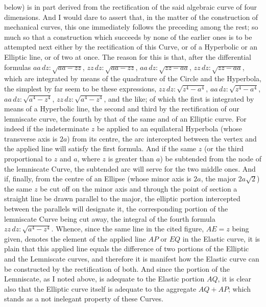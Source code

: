 \documentclass{article}
\begin{document}
below) is in part derived from the rectification of the said algebraic curve of four dimensions. And
I would dare to assert that, in the matter of the construction of mechanical curves, this one
immediately follows the preceding among the rest; so much so that a construction which succeeds by
none of the earlier ones is to be attempted next either by the rectification of this Curve, or of a
Hyperbolic or an Elliptic line, or of two at once. The reason for this is that, after the differential
formulas $aa\,dz : \sqrt{aa - zz}$, $zz\,dz : \sqrt{aa - zz}$, $aa\,dz : \sqrt{zz - aa}$,
$zz\,dz : \sqrt{zz - aa}$, which are integrated by means of the quadrature of the Circle and the
Hyperbola, the simplest by far seem to be these expressions, $zz\,dz : \sqrt{z^{4}-a^{4}}$,
$aa\,dz : \sqrt{z^{4}-a^{4}}$, $aa\,dz : \sqrt{a^{4}-z^{4}}$, $zz\,dz : \sqrt{a^{4}-z^{4}}$, and the
like; of which the first is integrated by means of a Hyperbolic line, the second and third by the
rectification of our lemniscate curve, the fourth by that of the same and of an Elliptic curve. For
indeed if the indeterminate $z$ be applied to an equilateral Hyperbola (whose transverse axis is
$2a$) from its centre, the arc intercepted between the vertex and the applied line will satisfy the
first formula. And if the same $z$ (or the third proportional to $z$ and $a$, where $z$ is greater
than $a$) be subtended from the node of the lemniscate Curve, the subtended arc will serve for the
two middle ones. And if, finally, from the centre of an Ellipse (whose minor axis is $2a$, the major
$2a\sqrt{2}$) the same $z$ be cut off on the minor axis and through the point of section a straight
line be drawn parallel to the major, the elliptic portion intercepted between the parallels will
designate it, the corresponding portion of the lemniscate Curve being cut away, the integral of the
fourth formula $zz\,dz : \sqrt{a^{4}-z^{4}}$. Whence, since the same line in the cited figure,
$AE = z$ being given, denotes the element of the applied line $AP$ or $EQ$ in the Elastic curve, it is
plain that this applied line equals the difference of two portions of the Elliptic and the Lemniscate
curves, and therefore it is manifest how the Elastic curve can be constructed by the rectification of
both. And since the portion of the Lemniscate, as I noted above, is adequate to the Elastic portion
$AQ$, it is clear also that the Elliptic curve itself is adequate to the aggregate $AQ + AP$; which
stands as a not inelegant property of these Curves.
\end{document}
